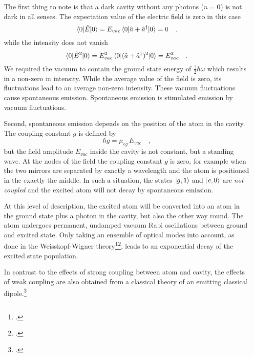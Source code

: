 The first thing to note is that a dark cavity without any photons ($n=0$) is not dark in all senses. The expectation value of the electric field is zero in this case
\begin{equation}
 \braket{ 0 | \hat{E} | 0} = 
    E_{vac} \braket{0 | \hat{a}  + \hat{a}^\dagger    | 0  } 
       = 0 \quad , \label{eq:purcell_E00}
\end{equation}
while the intensity does not vanish
\begin{equation}
 \braket{ 0 | \hat{E}^2 | 0} = E_{vac}^2
    \braket{0 | (\hat{a}  + \hat{a}^\dagger )^2   | 0  }  
    =    E_{vac}^2 \quad . \label{eq:purcell_E00_sq}
\end{equation}
We required the vacuum to contain the ground state energy of $\frac{1}{2} \hbar \omega$ which results in a non-zero in intensity. While the average value of the field is zero, its fluctuations lead to an average non-zero intensity. These vacuum fluctuations cause spontaneous emission. Spontaneous emission is stimulated emission by vacuum fluctuations.

Second, spontaneous emission depends on the position of the atom in the cavity. The coupling constant $g$ is defined by
\begin{equation}
\hbar  g = \mu_{eg} \, E_{vac}  \quad ,
\end{equation}
but the field amplitude $ E_{vac} $ inside the cavity is not constant, but a standing wave. At the nodes of the field the coupling constant $g$ is zero, for example when the two mirrors are separated by exactly a wavelength and the atom is positioned in the exactly the middle. In such a situation, the states $\ket{g, 1}$ and $\ket{e, 0}$ are \emph{not coupled} and the excited atom will not decay by spontaneous emission.

At this level of description, the excited atom will be converted into an atom in the ground state plus a photon in the cavity, but also the other way round. The atom undergoes permanent, undamped vacuum Rabi oscillations between ground and excited state. Only taking an ensemble of optical modes into account, as done in the Weisskopf-Wigner theory\footcite[chapter 8.4]{Novotny-Hecht2012}\footcite[chapter 14.3]{MeystreSargent2007}, leads to an exponential decay of the excited state population.

In contrast to the effects of strong coupling between atom and cavity, the effects of weak coupling are also obtained from a classical theory of an emitting classical dipole.\footcite[chapter 4.10]{Loudon}

